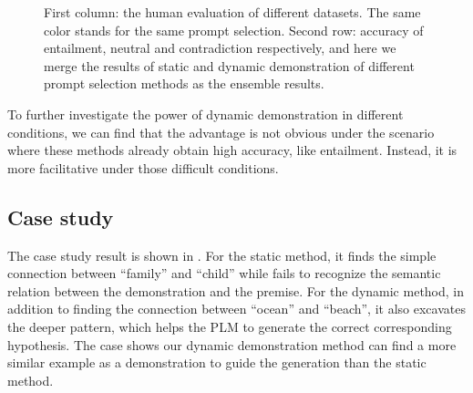 \begin{figure}[th]
	\centering
	\caption{First column: the human evaluation of different datasets. The same color stands for the same prompt selection. Second row: accuracy of entailment, neutral and contradiction respectively, and here we merge the results of static and dynamic demonstration of different prompt selection methods as the ensemble results.}
	\label{fig:human}
\end{figure}

To further investigate the power of dynamic demonstration in different conditions, we can find that the advantage is not obvious under the scenario where these methods already obtain high accuracy, like entailment. Instead, it is more facilitative under those difficult conditions.



\subsection{Case study}
The case study result is shown in . For the static method, it finds the simple connection between ``family'' and ``child'' while fails to recognize the semantic relation between the demonstration and the premise. For the dynamic method, in addition to finding the connection between ``ocean'' and ``beach'', it also excavates the deeper pattern, which helps the PLM to generate the correct corresponding hypothesis. 
The case shows our dynamic demonstration method can find a more similar example as a demonstration to guide the generation than the static method.

